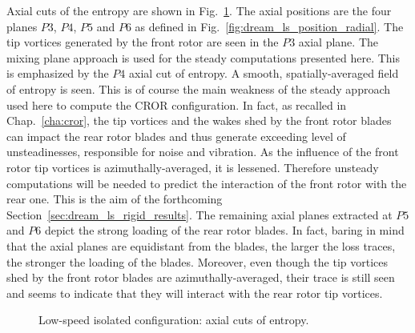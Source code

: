 Axial cuts of the entropy are shown in Fig.~\ref{fig:dream_ls_steady_entropy}.
The axial positions are the four planes $P3$, $P4$, $P5$
and $P6$ as defined in Fig.~\ref{fig:dream_ls_position_radial}.
The tip vortices generated by the front rotor are seen in the $P3$
axial plane. The mixing plane approach is used for the steady computations
presented here. This is emphasized by the $P4$ axial cut of entropy. A
smooth, spatially-averaged field of entropy is seen. This is of course the main
weakness of the steady approach used here to compute the CROR configuration.
In fact, as recalled in Chap.~\ref{cha:cror}, the tip vortices and the wakes shed by the
front rotor blades can impact the rear rotor blades and thus generate
exceeding level of unsteadinesses, responsible for noise and vibration. As the influence
of the front rotor tip vortices is azimuthally-averaged, it is
lessened. Therefore unsteady computations will be needed to
predict the interaction of the front rotor with the rear one.
This is the aim of the forthcoming Section~\ref{sec:dream_ls_rigid_results}.
The remaining axial planes extracted at $P5$ and $P6$ depict the strong loading
of the rear rotor blades. In fact, baring in mind that the
axial planes are equidistant from the blades, the larger the loss traces,
the stronger the loading of the blades. Moreover, even though the
tip vortices shed by the front rotor 
blades are azimuthally-averaged,
their trace is still seen and seems to indicate that they will
interact with the rear rotor tip vortices.
\begin{figure}[htp]
  \centering
  \caption{Low-speed isolated configuration: axial cuts of entropy.}
   \label{fig:dream_ls_steady_entropy}
\end{figure}